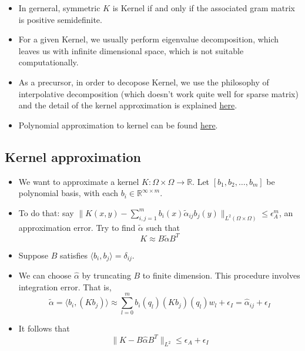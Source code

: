 \documentclass[11pt,reqno]{amsart}
\theoremstyle{remark}
\newtheorem{example}{Example}
\begin{document}
\begin{sloppypar}
\begin{itemize}
\begin{example}
Let $K(x,x')=\exp(-\frac{\lVert x-x'\rVert^2}{2\sigma})$.
By setting $\psi(x)=\frac{1}{\sqrt{n!}}\exp(-\frac{x^2}{2})x^n, n=0,1,\dots$, we have
\[
\langle \psi(x),\psi(x')\rangle=\exp(-\frac{\lVert x-x'\rVert^2}{2})
\]
\end{example}
\item In gerneral, symmetric $K$ is Kernel if and only if the associated gram matrix is positive semidefinite.
\item For a given Kernel, we usually perform eigenvalue decomposition, which leaves us with infinite dimensional space, 
which is not suitable computationally.
\item As a precursor, in order to decopose Kernel, we use the philosophy of interpolative decomposition (which doesn't work quite well for sparse matrix)
 and the detail of the kernel approximation is explained \href{https://arxiv.org/pdf/2006.02545.pdf}{here}.
\item Polynomial approximation to kernel can be found \href{https://arxiv.org/pdf/1109.4603.pdf}{here}.
\end{itemize}

\subsection*{Kernel approximation}
\begin{itemize}
\item We want to approximate a kernel $K:\Omega\times\Omega\to\mathbb{R}$. Let $[b_1,b_2,\dots,b_m]$ be polynomial basis, with each $b_i\in\mathbb{R}^{\infty\times m}$.
\item To do that: say $\lVert K(x,y)-\sum\limits^m_{i,j=1}b_i(x)\tilde\alpha_{ij}b_j(y)\rVert_{L^2(\Omega\times\Omega)}\leq\epsilon^m_A$, an approximation error. Try to find $\tilde\alpha$ such that
\[
K\approx B\tilde \alpha B^T
\]
\item Suppose $B$ satisfies $\langle b_i,b_j\rangle=\delta_{ij}$. 
\item We can choose $\hat\alpha$ by truncating $B$ to finite dimension. This procedure involves integration error. That is, 
\[
\tilde\alpha=\langle b_i, (Kb_j)\rangle\approx\sum_{l=0}^{m}b_i(q_l)(Kb_j)(q_l)w_l+\epsilon_I=\hat\alpha_{ij}+\epsilon_I
\]
\item It follows that 
\[
\lVert K-B\hat \alpha B^T\rVert_{L^2}\leq \epsilon_A+\epsilon_I
\]


\end{itemize}
\end{sloppypar}
\end{document}
